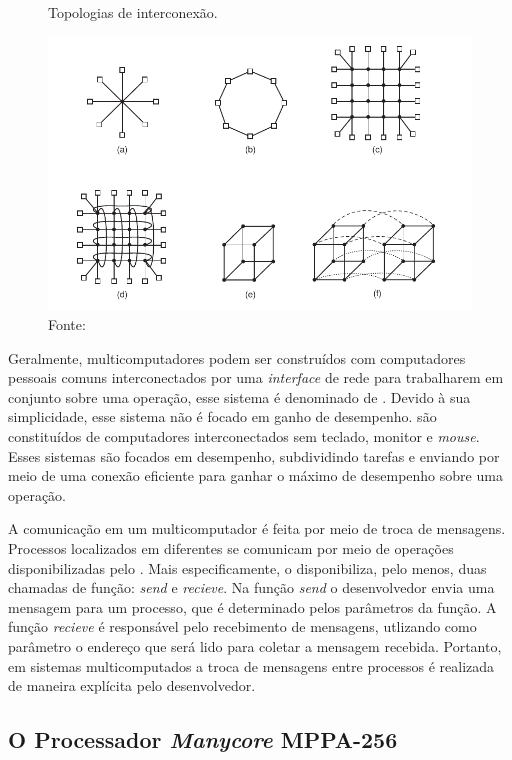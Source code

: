 \begin{figure}[t]
	\centering
        \caption{Topologias de interconexão.}
	\includegraphics[width=\textwidth]{figs/topologia.pdf}
    \caption*{Fonte: \cite{Tanenbaum2015}}
    \label{fig:topologia}
\end{figure}


Geralmente, multicomputadores podem ser construídos com computadores pessoais
comuns interconectados por uma \textit{interface} de rede para trabalharem em
conjunto sobre uma operação, esse sistema é denominado de \now. Devido à sua
simplicidade, esse sistema não é focado em ganho de desempenho. \cow
são constituídos de computadores interconectados sem teclado, monitor e \textit{mouse}. Esses
sistemas são focados em desempenho, subdividindo tarefas e enviando por meio de
uma conexão eficiente para ganhar o máximo de desempenho sobre uma operação.

A comunicação em um multicomputador é feita por meio de troca de mensagens.
Processos localizados em diferentes \cpus se comunicam por meio de operações
disponibilizadas pelo \so. Mais especificamente, o \so disponibiliza, pelo
menos, duas chamadas de função: \textit{send} e  \textit{recieve}. Na função
\textit{send} o desenvolvedor envia uma mensagem para um processo, que é determinado pelos
parâmetros da função. A função \textit{recieve} é responsável pelo recebimento
de mensagens, utlizando como parâmetro o endereço que será lido para coletar a
mensagem recebida. Portanto, em sistemas multicomputados a troca de mensagens
entre processos é realizada de maneira explícita pelo desenvolvedor.


\subsection{O Processador \textit{Manycore} MPPA-256}

